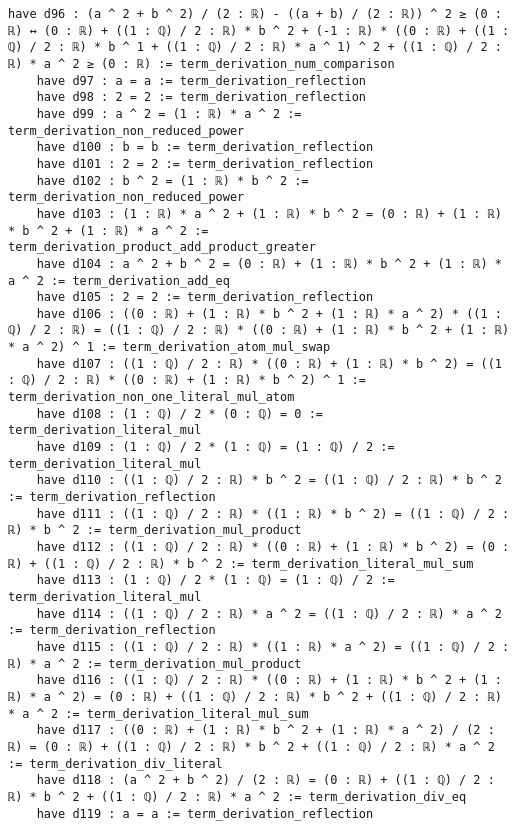 \documentclass{article}
\begin{document}
\begin{tcolorbox}[colback=white!10, width=\linewidth]
\begin{lstlisting}[language=Lean4]
    have d96 : (a ^ 2 + b ^ 2) / (2 : ℝ) - ((a + b) / (2 : ℝ)) ^ 2 ≥ (0 : ℝ) ↔ (0 : ℝ) + ((1 : ℚ) / 2 : ℝ) * b ^ 2 + (-1 : ℝ) * ((0 : ℝ) + ((1 : ℚ) / 2 : ℝ) * b ^ 1 + ((1 : ℚ) / 2 : ℝ) * a ^ 1) ^ 2 + ((1 : ℚ) / 2 : ℝ) * a ^ 2 ≥ (0 : ℝ) := term_derivation_num_comparison
    have d97 : a = a := term_derivation_reflection
    have d98 : 2 = 2 := term_derivation_reflection
    have d99 : a ^ 2 = (1 : ℝ) * a ^ 2 := term_derivation_non_reduced_power
    have d100 : b = b := term_derivation_reflection
    have d101 : 2 = 2 := term_derivation_reflection
    have d102 : b ^ 2 = (1 : ℝ) * b ^ 2 := term_derivation_non_reduced_power
    have d103 : (1 : ℝ) * a ^ 2 + (1 : ℝ) * b ^ 2 = (0 : ℝ) + (1 : ℝ) * b ^ 2 + (1 : ℝ) * a ^ 2 := term_derivation_product_add_product_greater
    have d104 : a ^ 2 + b ^ 2 = (0 : ℝ) + (1 : ℝ) * b ^ 2 + (1 : ℝ) * a ^ 2 := term_derivation_add_eq
    have d105 : 2 = 2 := term_derivation_reflection
    have d106 : ((0 : ℝ) + (1 : ℝ) * b ^ 2 + (1 : ℝ) * a ^ 2) * ((1 : ℚ) / 2 : ℝ) = ((1 : ℚ) / 2 : ℝ) * ((0 : ℝ) + (1 : ℝ) * b ^ 2 + (1 : ℝ) * a ^ 2) ^ 1 := term_derivation_atom_mul_swap
    have d107 : ((1 : ℚ) / 2 : ℝ) * ((0 : ℝ) + (1 : ℝ) * b ^ 2) = ((1 : ℚ) / 2 : ℝ) * ((0 : ℝ) + (1 : ℝ) * b ^ 2) ^ 1 := term_derivation_non_one_literal_mul_atom
    have d108 : (1 : ℚ) / 2 * (0 : ℚ) = 0 := term_derivation_literal_mul
    have d109 : (1 : ℚ) / 2 * (1 : ℚ) = (1 : ℚ) / 2 := term_derivation_literal_mul
    have d110 : ((1 : ℚ) / 2 : ℝ) * b ^ 2 = ((1 : ℚ) / 2 : ℝ) * b ^ 2 := term_derivation_reflection
    have d111 : ((1 : ℚ) / 2 : ℝ) * ((1 : ℝ) * b ^ 2) = ((1 : ℚ) / 2 : ℝ) * b ^ 2 := term_derivation_mul_product
    have d112 : ((1 : ℚ) / 2 : ℝ) * ((0 : ℝ) + (1 : ℝ) * b ^ 2) = (0 : ℝ) + ((1 : ℚ) / 2 : ℝ) * b ^ 2 := term_derivation_literal_mul_sum
    have d113 : (1 : ℚ) / 2 * (1 : ℚ) = (1 : ℚ) / 2 := term_derivation_literal_mul
    have d114 : ((1 : ℚ) / 2 : ℝ) * a ^ 2 = ((1 : ℚ) / 2 : ℝ) * a ^ 2 := term_derivation_reflection
    have d115 : ((1 : ℚ) / 2 : ℝ) * ((1 : ℝ) * a ^ 2) = ((1 : ℚ) / 2 : ℝ) * a ^ 2 := term_derivation_mul_product
    have d116 : ((1 : ℚ) / 2 : ℝ) * ((0 : ℝ) + (1 : ℝ) * b ^ 2 + (1 : ℝ) * a ^ 2) = (0 : ℝ) + ((1 : ℚ) / 2 : ℝ) * b ^ 2 + ((1 : ℚ) / 2 : ℝ) * a ^ 2 := term_derivation_literal_mul_sum
    have d117 : ((0 : ℝ) + (1 : ℝ) * b ^ 2 + (1 : ℝ) * a ^ 2) / (2 : ℝ) = (0 : ℝ) + ((1 : ℚ) / 2 : ℝ) * b ^ 2 + ((1 : ℚ) / 2 : ℝ) * a ^ 2 := term_derivation_div_literal
    have d118 : (a ^ 2 + b ^ 2) / (2 : ℝ) = (0 : ℝ) + ((1 : ℚ) / 2 : ℝ) * b ^ 2 + ((1 : ℚ) / 2 : ℝ) * a ^ 2 := term_derivation_div_eq
    have d119 : a = a := term_derivation_reflection

\end{lstlisting}
\end{tcolorbox}
\end{document}
